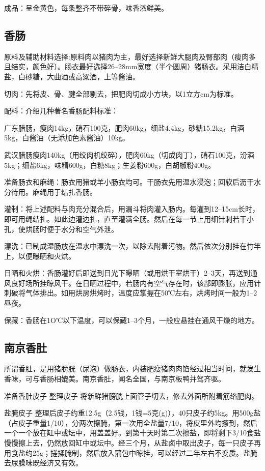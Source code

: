 \documentclass{ctexbook}
\begin{document}
成品：呈金黄色，每条整齐不带碎骨，味香浓鲜美。
\subsection{香肠}
原料及辅助材料选择:原料肉以猪肉为主，最好选择新鲜大腿肉及臀部肉（瘦肉多且结实，颜色好）。肠衣最好选择26--28mm宽度〈半个圆周）猪肠衣。采用洁白精盐，白砂糖，大曲酒或高粱酒，上等酱油。

切肉：先将皮、骨、腱全部剔去，把肥肉切成小方块，以1立方cm为标准。

配料：介绍几种著名香肠配料标准：

广东腊肠，瘦肉14kg，硝石100克，肥肉60kg，细盐4.4kg，砂糖15.2kg，白酒5kg，白酱油（无添加色素酱油）10kg。

武汉腊肠瘦肉140kg（用绞肉机绞碎），肥肉60kg（切成肉丁），硝石100克，汾酒5kg；细盐6kg，味精600g，白糖8kg；生姜粉600g，白胡椒粉400g。

准备肠衣和麻绳：肠衣用猪或羊小肠衣均可。干肠衣先用温水浸泡；回软后沥干水分待用。麻绳用于结扎香肠。

灌制：将上述配料与肉充分混合后，用漏斗将肉灌入肠内。每灌到12--15cm长时，即可用绳结扎。如此边灌边扎，直至灌满全肠。然后在每一节上用细针刺若干小孔，使烘肠时便于水分和空气外泄。

漂洗：已制成湿肠放在温水中漂洗一次，以除去附着污物。然后依次分别挂在竹竿上，以便曝晒和火烘。

日晒和火烘：香肠灌好后即送到日光下曝晒（或用烘干室烘干）2--3天，再送到通风良好场所挂晾风干。在日晒过程中，若肠内有空气存在时，该部即膨胀，应用针刺破将气体排出。如用烘房烘烤时，温度应掌握在50℃左右，烘烤时间一般为1--2昼夜。

保藏：香肠在1O℃以下温度，可以保藏1--3个月，一般应悬挂在通风干燥的地方。
\subsection{南京香肚}
所谓香肚，是用猪膀胱（尿泡）做肠衣，内装肥瘦猪肉肉馅经过相当时间，就发生香味，可与香肠相媲美。南京香肚，闻名全国，与南京板鸭并驾齐驱。

准备香肚皮子
整理皮子 将新鲜猪膀胱上面管子切去，修去外面所附着筋络肥肉。

盐腌皮子 整理后皮子约重12.5g（2.5钱，1钱=5克(g)），40只皮子约5kg。用500g盐（占皮子重量1/10），分两次擦腌，第一次用全盐量7/10，将皮里外均擦到，然后一个一个放在缸中或坛中，用盖盖好。到第十天时第二次擦盐，即将剩下3/10食盐慢慢擦上去，仍然放回缸中或坛中。经三个月，从盐卤中取出皮子，每一只皮子再用食盐约25g；搓揉腌制，然后放入蒲包中晾挂，可以经过二年左右不变质。盐腌去尿臊味既经济又有效。
\end{document}
